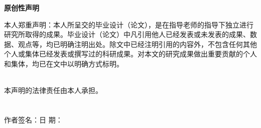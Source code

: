 
{\hfill \erhao{}\textbf {原创性声明} \hfill}
\label{original}
\thispagestyle{headFancy}
\vspace*{18pt}
\linespread{1.25}
\song\xiaosan

本人郑重声明：本人所呈交的毕业设计（论文），是在指导老师的指导下独立进行研究所取得的成果。毕业设计（论文）中凡引用他人已经发表或未发表的成果、数据、观点等，均已明确注明出处。除文中已经注明引用的内容外，不包含任何其他个人或集体已经发表或撰写过的科研成果。对本文的研究成果做出重要贡献的个人和集体，均已在文中以明确方式标明。

~\\
\noindent 本声明的法律责任由本人承担。\\
~\\
~\\
作者签名：\hspace{5cm}日  期：
